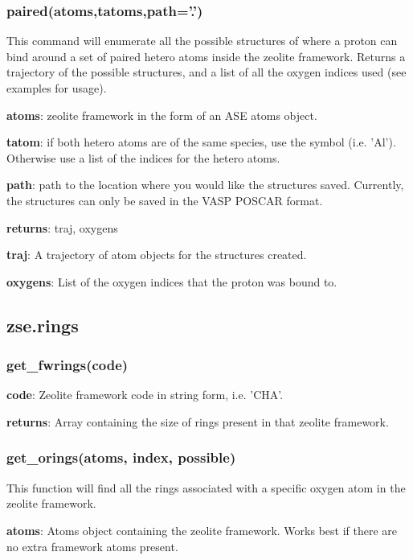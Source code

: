 \documentclass[11pt]{article}
\begin{document}
\subsubsection{paired(atoms,tatoms,path='.')}
\label{sec:orgfbe74b8}

This command will enumerate all the possible structures of where a proton can bind around a set of paired hetero atoms inside the zeolite framework. Returns a trajectory of the possible structures, and a list of all the oxygen indices used (see examples for usage).

\textbf{atoms}: zeolite framework in the form of an ASE atoms object.

\textbf{tatom}: if both hetero atoms are of the same species, use the symbol (i.e. 'Al'). Otherwise use a list of the indices for the hetero atoms.

\textbf{path}: path to the location where you would like the structures saved. Currently, the structures can only be saved in the VASP POSCAR format.

\textbf{returns}: traj, oxygens

\textbf{traj}: A trajectory of atom objects for the structures created.

\textbf{oxygens}: List of the oxygen indices that the proton was bound to.

\subsection{zse.rings}
\label{sec:orga6dd227}

\subsubsection{get\_fwrings(code)}
\label{sec:org629ee1a}

\textbf{code}: Zeolite framework code in string form, i.e. 'CHA'.

\textbf{returns}: Array containing the size of rings present in that zeolite framework.


\subsubsection{get\_orings(atoms, index, possible)}
\label{sec:orge65ed7c}

This function will find all the rings associated with a specific oxygen atom in the zeolite framework.

\textbf{atoms}: Atoms object containing the zeolite framework. Works best if there are no extra framework atoms present.
\end{document}
